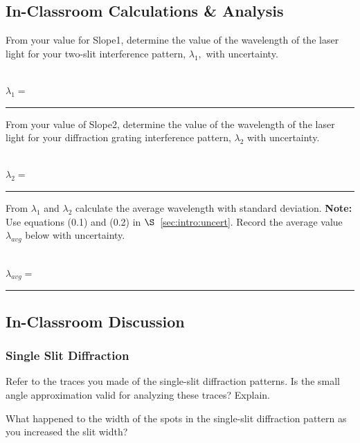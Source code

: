 \subsection{In-Classroom Calculations \& Analysis}


From your value for Slope1, determine the value of the wavelength of
the laser light for your two-slit interference pattern, $\lambda _1,$
with uncertainty. \\
\vspace*{2cm} \\
\begin{center}
$\lambda _1=$~ \rule{3cm}{.1mm} 
\end{center}
\noindent From your value of Slope2, determine the value of
the wavelength of the laser light for your diffraction grating
interference pattern, $\lambda _2$ with uncertainty. \\
\vspace*{2cm} \\
\begin{center}
$\lambda _2=$~ \rule{3cm}{.1mm}
\end{center}

\noindent
From $\lambda _1$ and $\lambda _2$ calculate the average wavelength
with standard deviation. {\bf Note:} Use equations (0.1) and (0.2) in
$\S$~\ref{sec:intro:uncert}. Record the average value $\lambda
_{avg}$ below with uncertainty. \\
\vspace*{3cm} \\ 
\begin{center}
$\lambda _{avg}=$~ \rule{3cm}{.1mm}
\end{center}

\subsection{In-Classroom Discussion}
\subsubsection{Single Slit Diffraction}
Refer to the traces you made of the single-slit diffraction patterns.
Is the small angle approximation valid for analyzing these traces?
Explain.
\vspace*{2cm}

\noindent 
What happened to the width of the spots in the single-slit diffraction
pattern as you increased the slit width?
\vspace*{2cm}

